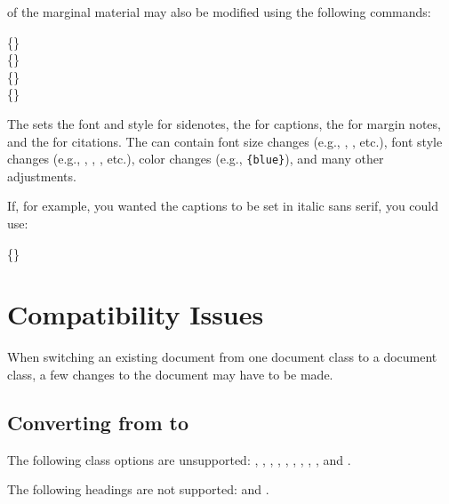  of the marginal material may also be modified using the following commands:

\begin{docspec}
  \{\}\\
  \{\}\\
  \{\}\\
  \{\}
\end{docspec}

The  sets the font and style for sidenotes, the
 for captions, the  for
margin notes, and the  for citations.  The
 can contain font size changes (e.g.,
, , etc.), font style changes (e.g.,
, , , etc.), color changes (e.g.,
\texttt{\{blue\}}), and many other adjustments.

If, for example, you wanted the captions to be set in italic sans serif, you could use:
\begin{docspec}
  \{\}
\end{docspec}

\chapter{Compatibility Issues}
\label{ch:compatibility}

When switching an existing document from one document class to a \TL document class, a few changes to the document may have to be made.

\section{Converting from  to }

The following  class options are unsupported: \docclsopt{10pt}, \docclsopt{11pt}, \docclsopt{12pt}, , , , , , , and .

The following headings are not supported:  and .

